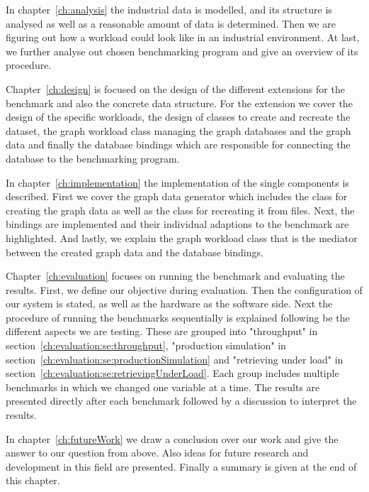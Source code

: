 In chapter~\ref{ch:analysis} the industrial data is modelled,
and its structure is analysed as well as a reasonable amount of data is determined.
Then we are figuring out how a workload could look like in an industrial environment.
At last,
we further analyse out chosen benchmarking program and give an overview of its procedure.

Chapter~\ref{ch:design} is focused on the design of the different extensions for the benchmark and also the concrete data structure.
For the extension we cover the design of the specific workloads,
the design of classes to create and recreate the dataset,
the graph workload class managing the graph databases and the graph data and finally the database bindings which are responsible for connecting the database to the benchmarking program.

In chapter~\ref{ch:implementation} the implementation of the single components is described.
First we cover the graph data generator which includes the class for creating the graph data as well as the class for recreating it from files.
Next,
the bindings are implemented and their individual adaptions to the benchmark are highlighted.
And lastly,
we explain the graph workload class that is the mediator between the created graph data and the database bindings.

Chapter~\ref{ch:evaluation} focuses on running the benchmark and evaluating the results.
First, we define our objective during evaluation.
Then the configuration of our system is stated, as well as the hardware as the software side.
Next the procedure of running the benchmarks sequentially is explained following be the different aspects we are testing.
These are grouped into "throughput" in section~\ref{ch:evaluation:se:throughput}, "production simulation" in section~\ref{ch:evaluation:se:productionSimulation} and "retrieving under load" in section~\ref{ch:evaluation:se:retrievingUnderLoad}.
Each group includes multiple benchmarks in which we changed one variable at a time.
The results are presented directly after each benchmark followed by a discussion to interpret the results.

In chapter~\ref{ch:futureWork} we draw a conclusion over our work and give the answer to our question from above.
Also ideas for future research and development in this field are presented.
Finally a summary is given at the end of this chapter.
